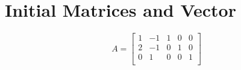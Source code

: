 \documentclass [12pt] {article}
\begin{document}
\section*{Initial Matrices and Vector}

\[
A  =
\begin{bmatrix}
1 & -1 & 1 & 0 & 0 \\ 2 & -1  & 0 &1 & 0\\ 0 & 1 & 0 & 0 & 1\\ 
\end{bmatrix}
\]
\end{document}

